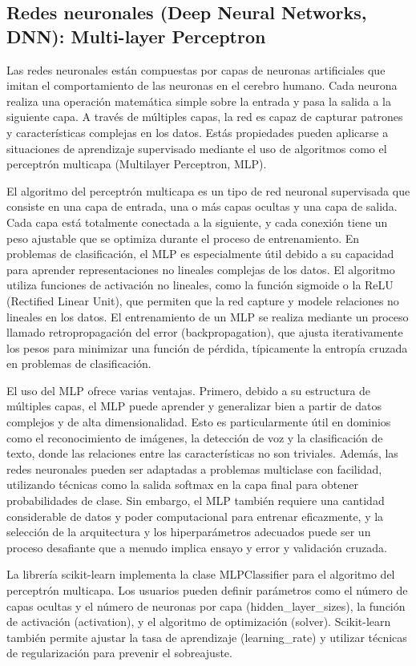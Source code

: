 \subsection{Redes neuronales (Deep Neural Networks, DNN): Multi-layer Perceptron}
\label{subsec:model-neural}

Las redes neuronales están compuestas por capas de neuronas artificiales que imitan el comportamiento de las neuronas en el cerebro humano. Cada neurona realiza una operación matemática simple sobre la entrada y pasa la salida a la siguiente capa. A través de múltiples capas, la red es capaz de capturar patrones y características complejas en los datos. Estás propiedades pueden aplicarse a situaciones de aprendizaje supervisado mediante el uso de algoritmos como el perceptrón multicapa (Multilayer Perceptron, MLP).

El algoritmo del perceptrón multicapa \cite{goodfellow2016deep} es un tipo de red neuronal supervisada que consiste en una capa de entrada, una o más capas ocultas y una capa de salida. Cada capa está totalmente conectada a la siguiente, y cada conexión tiene un peso ajustable que se optimiza durante el proceso de entrenamiento. En problemas de clasificación, el MLP es especialmente útil debido a su capacidad para aprender representaciones no lineales complejas de los datos. El algoritmo utiliza funciones de activación no lineales, como la función sigmoide o la ReLU (Rectified Linear Unit), que permiten que la red capture y modele relaciones no lineales en los datos. El entrenamiento de un MLP se realiza mediante un proceso llamado retropropagación del error (backpropagation), que ajusta iterativamente los pesos para minimizar una función de pérdida, típicamente la entropía cruzada en problemas de clasificación.

El uso del MLP ofrece varias ventajas. Primero, debido a su estructura de múltiples capas, el MLP puede aprender y generalizar bien a partir de datos complejos y de alta dimensionalidad. Esto es particularmente útil en dominios como el reconocimiento de imágenes, la detección de voz y la clasificación de texto, donde las relaciones entre las características no son triviales. Además, las redes neuronales pueden ser adaptadas a problemas multiclase con facilidad, utilizando técnicas como la salida softmax en la capa final para obtener probabilidades de clase. Sin embargo, el MLP también requiere una cantidad considerable de datos y poder computacional para entrenar eficazmente, y la selección de la arquitectura y los hiperparámetros adecuados puede ser un proceso desafiante que a menudo implica ensayo y error y validación cruzada.

La librería scikit-learn implementa la clase MLPClassifier \cite{sk-multilayer-perceptron} para el algoritmo del perceptrón multicapa. Los usuarios pueden definir parámetros como el número de capas ocultas y el número de neuronas por capa (hidden\_layer\_sizes), la función de activación (activation), y el algoritmo de optimización (solver). Scikit-learn también permite ajustar la tasa de aprendizaje (learning\_rate) y utilizar técnicas de regularización para prevenir el sobreajuste.